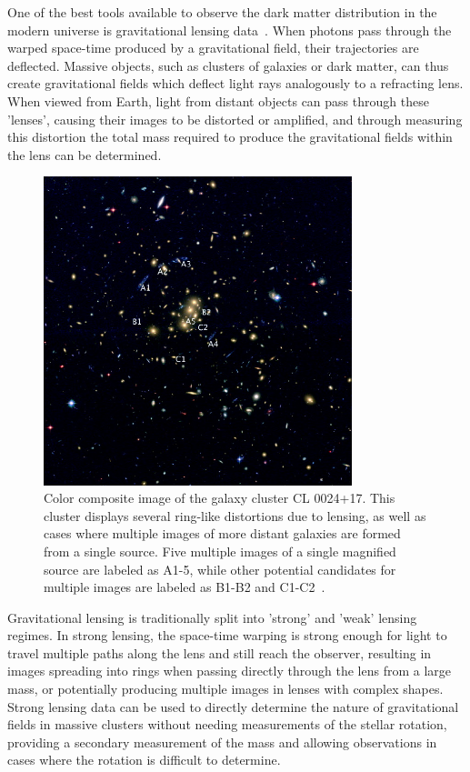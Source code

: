 One of the best tools available to observe the dark matter distribution in the modern universe is gravitational lensing data~\cite{Massey_2010}.
When photons pass through the warped space-time produced by a gravitational field, their trajectories are deflected.
Massive objects, such as clusters of galaxies or dark matter, can thus create gravitational fields which deflect light rays analogously to a refracting lens.
When viewed from Earth, light from distant objects can pass through these 'lenses', causing their images to be distorted or amplified, and through measuring this distortion the total mass required to produce the gravitational fields within the lens can be determined.

\begin{figure}
	\label{fig:gravLensing}
	\centering
	\includegraphics[width=0.8\textwidth]{figures/grav_lensing.jpg}
	\caption[Gravitational lensing of galaxy cluster CL0024+17]{ Color composite image of the galaxy cluster CL 0024+17. This cluster displays several ring-like distortions due to lensing, as well as cases where multiple images of more distant galaxies are formed from a single source. Five multiple images of a single magnified source are labeled as A1-5, while other potential candidates for multiple images are labeled as B1-B2 and C1-C2~\cite{jee2007}.}
\end{figure}

Gravitational lensing is traditionally split into 'strong' and 'weak' lensing regimes. 
In strong lensing, the space-time warping is strong enough for light to travel multiple paths along the lens and still reach the observer, resulting in images spreading into rings when passing directly through the lens from a large mass, or potentially producing multiple images in lenses with complex shapes.
Strong lensing data can be used to directly determine the nature of gravitational fields in massive clusters without needing measurements of the stellar rotation, providing a secondary measurement of the mass and allowing observations in cases where the rotation is difficult to determine.

